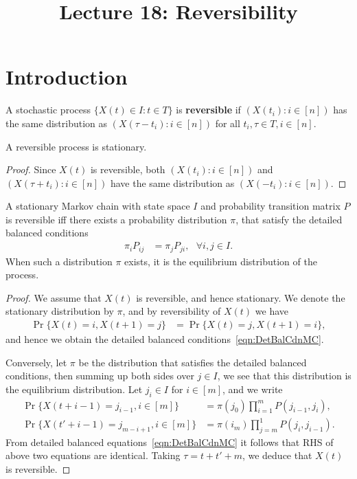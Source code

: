 \documentclass[a4paper,10pt,english]{article}
\title{Lecture 18: Reversibility}
\author{}
\begin{document}
\maketitle

\section{Introduction}
A stochastic process $\{X(t) \in I: t \in T\}$ is \textbf{reversible} if $(X(t_i): i \in [n])$ has the same distribution as $(X(\tau-t_i): i \in [n])$ for all $t_i, \tau \in T, i \in [n]$.
\begin{lem} 
A reversible process is stationary.
\end{lem}
\begin{proof}
Since $X(t)$ is reversible, both $(X(t_i): i\in [n])$ and $(X(\tau+t_i): i \in [n])$ have the same distribution as $(X(-t_i): i \in [n])$.
\end{proof}
\begin{thm} 
A stationary Markov chain with state space $I$ and probability transition matrix $P$ is reversible iff there exists a probability distribution $\pi$, that satisfy the detailed balanced conditions
\begin{align}
\label{eqn:DetBalCdnMC}
\pi_iP_{ij} &= \pi_jP_{ji},~~~ \forall i,j \in I.
\end{align}
When such a distribution $\pi$ exists, it is the equilibrium distribution of the process.
\end{thm}
\begin{proof} We assume that $X(t)$ is reversible, and hence stationary. We denote the stationary distribution by $\pi$, and by reversibility of $X(t)$ we have
\begin{align*}
\Pr\{X(t) = i , X(t+1) = j\} &= \Pr\{X(t) = j, X(t+1) = i\},
\end{align*}
and hence we obtain the detailed balanced conditions~\eqref{eqn:DetBalCdnMC}. 

Conversely, let $\pi$ be the distribution that satisfies the detailed balanced conditions, then
summing up both sides over $j \in I$, we see that this distribution is the equilibrium distribution.
Let $j_i \in I$ for $i \in [m]$, and we write
\begin{align*}
\Pr\{X(t+i-1) = j_{i-1}, i \in [m]\} &= \pi(j_0)\prod_{i=1}^mP(j_{i-1},j_{i}),\\
\Pr\{X(t'+i-1) = j_{m-i+1}, i \in [m]\} &= \pi(i_m)\prod_{j=m}^{1}P(j_i,j_{i-1}).
\end{align*}
From detailed balanced equations~\eqref{eqn:DetBalCdnMC} it follows that RHS of above two equations are identical. Taking $\tau = t+t'+m$, we deduce that $X(t)$ is reversible.
\end{proof}
\end{document}
